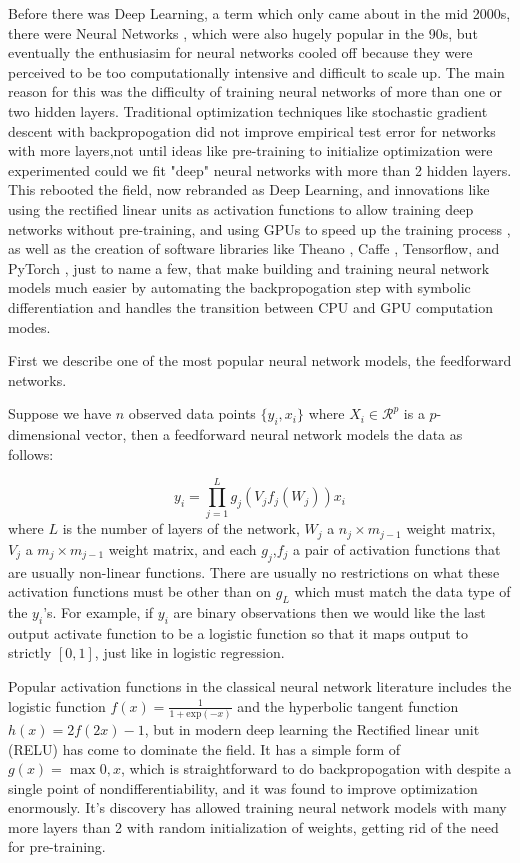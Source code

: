 \documentclass[]{report}
\begin{document}
Before there was Deep Learning, a term which only came about in the mid 2000s, there were Neural Networks \cite{bishop1995neural,ripley2007pattern}, which were also hugely popular in the 90s, but eventually the enthusiasim for neural networks cooled off because they were perceived to be too computationally intensive and difficult to scale up. The main reason for this was the difficulty of training neural networks of more than one or two hidden layers. Traditional optimization techniques like stochastic gradient descent with backpropogation did not improve empirical test error for networks with more layers,not until ideas like pre-training to initialize optimization were experimented could we fit "deep" neural networks with more than 2 hidden layers. This rebooted the field, now rebranded as Deep Learning, and innovations like using the rectified linear units as activation functions \cite{nair2010rectified} to allow training deep networks without pre-training, and using GPUs to speed up the training process \cite{krizhevsky2012imagenet}, as well as the creation of software libraries like Theano \cite{bergstra2010theano}, Caffe \cite{jia2014caffe}, Tensorflow\cite{tensorflow2015-whitepaper}, and PyTorch \cite{paszke2017automatic}, just to name a few, that make building and training neural network models much easier by automating the backpropogation step with symbolic differentiation \cite{bahrampour2015comparative} and handles the transition between CPU and GPU computation modes. 

First we describe one of the most popular neural network models, the feedforward networks.

Suppose we have $n$ observed data points $\{y_i,x_i\}$ where $X_i \in
\mathcal{R}^p$ is a $p$-dimensional vector, then a feedforward neural network models the
data as follows:

\[y_i = \prod_{j=1}^Lg_j(V_jf_j(W_j))x_i \]
where $L$ is the number of layers of the network, $W_j$ a $n_j \times m_{j-1}$
weight matrix, $V_j$ a $m_j \times m_{j-1}$ weight matrix, and each $g_j$,$f_j$
a pair of activation functions that are usually non-linear functions. There are
usually no restrictions on what these activation functions must be other than on
$g_L$ which must match the data type of the $y_i$'s. For example, if $y_i$ are
binary observations then we would like the last output activate function to be a
logistic function so that it maps output to strictly $[0,1]$, just like in
logistic regression.

Popular activation functions in the classical neural network literature includes
the logistic function $f(x) = \frac{1}{1+\text{exp}(-x)} $ and the hyperbolic tangent function $h(x) =  2f(2x)-1$, but in modern deep
learning the Rectified linear unit (RELU) has come to dominate the field. It has
a simple form of $g(x)=\max{0,x}$, which is straightforward to do
backpropogation with despite a single point of nondifferentiability, and it was
found to improve optimization enormously. It's discovery has allowed training
neural network models with many more layers than 2 with random initialization of
weights, getting rid of the need for pre-training. 
\end{document}
